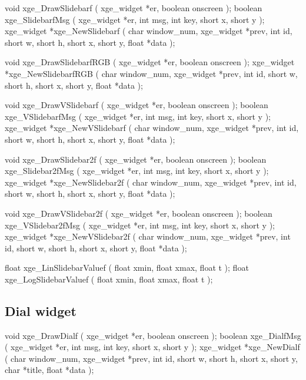 \begin{listingC}
void xge_DrawSlidebarf ( xge_widget *er, boolean onscreen );
boolean xge_SlidebarfMsg ( xge_widget *er,
                           int msg, int key, short x, short y );
xge_widget *xge_NewSlidebarf ( char window_num, xge_widget *prev,
                               int id,
                               short w, short h, short x, short y,
                               float *data );

void xge_DrawSlidebarfRGB ( xge_widget *er, boolean onscreen );
xge_widget *xge_NewSlidebarfRGB ( char window_num, xge_widget *prev,
                                  int id,
                                  short w, short h, short x, short y,
                                  float *data );

void xge_DrawVSlidebarf ( xge_widget *er, boolean onscreen );
boolean xge_VSlidebarfMsg ( xge_widget *er,
                            int msg, int key, short x, short y );
xge_widget *xge_NewVSlidebarf ( char window_num, xge_widget *prev,
                                int id,
                                short w, short h, short x, short y,
                                float *data );

void xge_DrawSlidebar2f ( xge_widget *er, boolean onscreen );
boolean xge_Slidebar2fMsg ( xge_widget *er,
                            int msg, int key, short x, short y );
xge_widget *xge_NewSlidebar2f ( char window_num, xge_widget *prev,
                                int id,
                                short w, short h, short x, short y,
                                float *data );

void xge_DrawVSlidebar2f ( xge_widget *er, boolean onscreen );
boolean xge_VSlidebar2fMsg ( xge_widget *er,
                             int msg, int key, short x, short y );
xge_widget *xge_NewVSlidebar2f ( char window_num, xge_widget *prev,
                                 int id,
                                 short w, short h, short x, short y,
                                 float *data );

float xge_LinSlidebarValuef ( float xmin, float xmax, float t );
float xge_LogSlidebarValuef ( float xmin, float xmax, float t );
\end{listingC}


\subsection{Dial widget}

\begin{listingC}
void xge_DrawDialf ( xge_widget *er, boolean onscreen );
boolean xge_DialfMsg ( xge_widget *er,
                       int msg, int key, short x, short y );
xge_widget *xge_NewDialf ( char window_num, xge_widget *prev,
                           int id,
                           short w, short h, short x, short y,
                           char *title, float *data );
\end{listingC}


